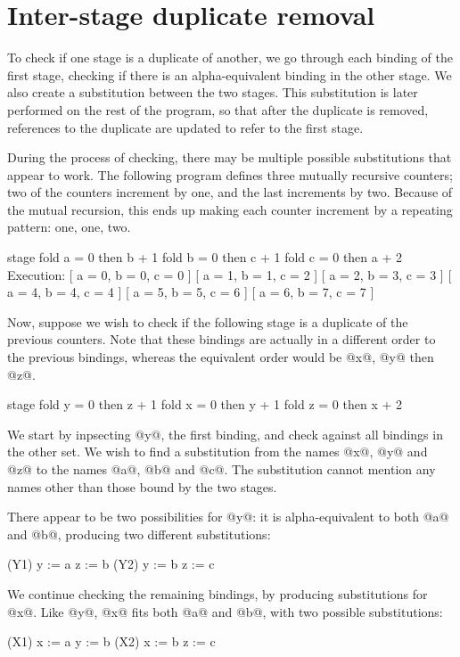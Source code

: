 \section{Inter-stage duplicate removal}
To check if one stage is a duplicate of another, we go through each binding of the first stage, checking if there is an alpha-equivalent binding in the other stage.
We also create a substitution between the two stages.
This substitution is later performed on the rest of the program, so that after the duplicate is removed, references to the duplicate are updated to refer to the first stage.

During the process of checking, there may be multiple possible substitutions that appear to work.
The following program defines three mutually recursive counters; two of the counters increment by one, and the last increments by two.
Because of the mutual recursion, this ends up making each counter increment by a repeating pattern: one, one, two.
\begin{code}
stage {
  fold a = 0 then b + 1
  fold b = 0 then c + 1
  fold c = 0 then a + 2
}
Execution:
[ a = 0, b = 0, c = 0 ]
[ a = 1, b = 1, c = 2 ]
[ a = 2, b = 3, c = 3 ]
[ a = 4, b = 4, c = 4 ]
[ a = 5, b = 5, c = 6 ]
[ a = 6, b = 7, c = 7 ]
\end{code}

Now, suppose we wish to check if the following stage is a duplicate of the previous counters.
Note that these bindings are actually in a different order to the previous bindings, whereas the equivalent order would be @x@, @y@ then @z@.
\begin{code}
stage {
  fold y = 0 then z + 1
  fold x = 0 then y + 1
  fold z = 0 then x + 2
}
\end{code}

We start by inpsecting @y@, the first binding, and check against all bindings in the other set.
We wish to find a substitution from the names @x@, @y@ and @z@ to the names @a@, @b@ and @c@.
The substitution cannot mention any names other than those bound by the two stages.

There appear to be two possibilities for @y@: it is alpha-equivalent to both @a@ and @b@, producing two different substitutions:
\begin{code}
(Y1)
y := a
z := b
(Y2)
y := b
z := c
\end{code}

We continue checking the remaining bindings, by producing substitutions for @x@.
Like @y@, @x@ fits both @a@ and @b@, with two possible substitutions:
\begin{code}
(X1)
x := a
y := b
(X2)
x := b
z := c
\end{code}


